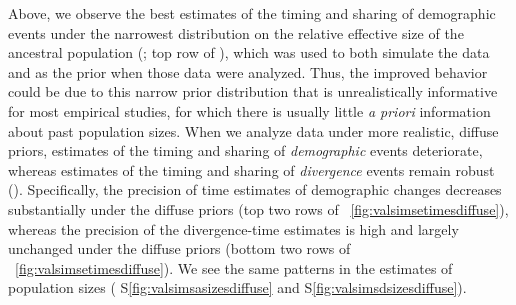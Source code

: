 Above, we observe the best estimates of the timing and sharing of demographic
events under the narrowest distribution on the relative effective size of the
ancestral population
(\vsimfourinc; top row of \figs
{}),
which was used to both simulate the data and as the prior
when those data were analyzed.
Thus, the improved behavior could be due to this narrow prior distribution that
is unrealistically informative for most empirical studies, for which there is
usually little \emph{a priori} information about past population sizes.
When we analyze data under more realistic, diffuse priors, estimates of the
timing and sharing of \emph{demographic} events deteriorate,
whereas estimates of the timing and sharing of \emph{divergence} events remain
robust
(\figs {}).
Specifically, the precision of time estimates of demographic changes decreases
substantially under the diffuse priors
(top two rows of \fig{}~\ref{fig:valsimsetimesdiffuse}),
whereas the precision of the divergence-time estimates
is high and largely unchanged under the diffuse priors
(bottom two rows of \fig{}~\ref{fig:valsimsetimesdiffuse}).
We see the same patterns in the estimates of population sizes
(\figs
S\ref{fig:valsimsasizesdiffuse}
and
S\ref{fig:valsimsdsizesdiffuse}).

